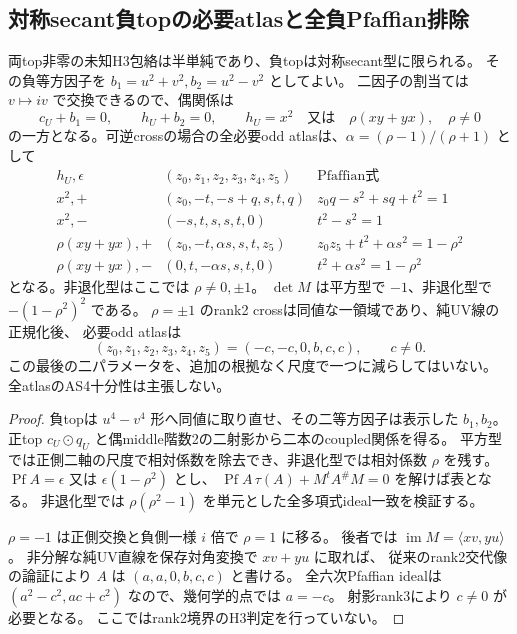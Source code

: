 \subsection{対称secant負topの必要atlasと全負Pfaffian排除}
\begin{proposition}\label{prop:h3-order2-22-secant-necessary-atlas}
両top非零の未知H3包絡は半単純であり、負topは対称secant型に限られる。
その負等方因子を $b_1=u^2+v^2,b_2=u^2-v^2$ としてよい。
二因子の割当ては $v\mapsto iv$ で交換できるので、偶関係は
\[
 c_U+b_1=0,\qquad h_U+b_2=0,\qquad
 h_U=x^2\quad\text{又は}\quad \rho(xy+yx),\quad\rho\ne0
\]
の一方となる。可逆crossの場合の全必要odd atlasは、$\alpha=(\rho-1)/(\rho+1)$ として
\[
\begin{array}{c|c|c}
 h_U,\epsilon&(z_0,z_1,z_2,z_3,z_4,z_5)&\text{Pfaffian式}\\\hline
 x^2,+&(z_0,-t,-s+q,s,t,q)&z_0q-s^2+sq+t^2=1\\
 x^2,-&(-s,t,s,s,t,0)&t^2-s^2=1\\
 \rho(xy+yx),+&(z_0,-t,\alpha s,s,t,z_5)&z_0z_5+t^2+\alpha s^2=1-\rho^2\\
 \rho(xy+yx),-&(0,t,-\alpha s,s,t,0)&t^2+\alpha s^2=1-\rho^2
\end{array}
\]
となる。非退化型はここでは $\rho\ne0,\pm1$。
$\det M$ は平方型で $-1$、非退化型で $-(1-\rho^2)^2$ である。
$\rho=\pm1$ のrank2 crossは同値な一領域であり、純UV線の正規化後、
必要odd atlasは
\[
 (z_0,z_1,z_2,z_3,z_4,z_5)=(-c,-c,0,b,c,c),\qquad c\ne0.
\]
この最後の二パラメータを、追加の根拠なく尺度で一つに減らしてはいない。
全atlasのAS4十分性は主張しない。
\end{proposition}
\begin{proof}
負topは $u^4-v^4$ 形へ同値に取り直せ、その二等方因子は表示した $b_1,b_2$。
正top $c_U\odot q_U$ と偶middle階数2の二射影から二本のcoupled関係を得る。
平方型では正側二軸の尺度で相対係数を除去でき、非退化型では相対係数 $\rho$ を残す。
$\operatorname{Pf}A=\epsilon$ 又は $\epsilon(1-\rho^2)$ とし、
$\operatorname{Pf}A\,\tau(A)+M^tA^\#M=0$ を解けば表となる。
非退化型では $\rho(\rho^2-1)$ を単元とした全多項式ideal一致を検証する。

$\rho=-1$ は正側交換と負側一様 $i$ 倍で $\rho=1$ に移る。
後者では $\operatorname{im}M=\langle xv,yu\rangle$。
非分解な純UV直線を保存対角変換で $xv+yu$ に取れば、
従来のrank2交代像の論証により $A$ は $(a,a,0,b,c,c)$ と書ける。
全六次Pfaffian idealは $(a^2-c^2,ac+c^2)$ なので、幾何学的点では $a=-c$。
射影rank3により $c\ne0$ が必要となる。
ここではrank2境界のH3判定を行っていない。
\end{proof}

